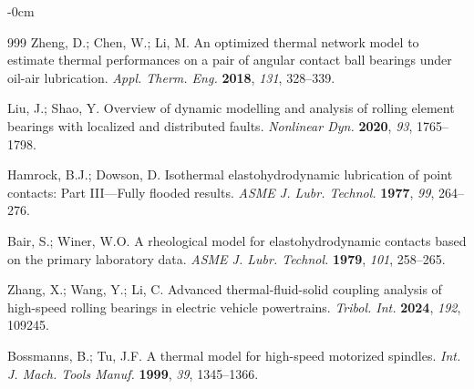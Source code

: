 \documentclass[applsci,article,submit,pdftex,moreauthors]{Definitions/mdpi}
\begin{document}
\begin{adjustwidth}{-\extralength}{0cm}
{\begin{thebibliography}{999}
Zheng, D.; Chen, W.; Li, M. An optimized thermal network model to estimate thermal performances on a pair of angular contact ball bearings under oil-air lubrication. {\em Appl. Therm. Eng.} {\bf 2018}, {\em 131}, 328--339.

Liu, J.; Shao, Y. Overview of dynamic modelling and analysis of rolling element bearings with localized and distributed faults. {\em Nonlinear Dyn.} {\bf 2020}, {\em 93}, 1765--1798.

Hamrock, B.J.; Dowson, D. Isothermal elastohydrodynamic lubrication of point contacts: Part III---Fully flooded results. {\em ASME J. Lubr. Technol.} {\bf 1977}, {\em 99}, 264--276.

Bair, S.; Winer, W.O. A rheological model for elastohydrodynamic contacts based on the primary laboratory data. {\em ASME J. Lubr. Technol.} {\bf 1979}, {\em 101}, 258--265.

Zhang, X.; Wang, Y.; Li, C. Advanced thermal-fluid-solid coupling analysis of high-speed rolling bearings in electric vehicle powertrains. {\em Tribol. Int.} {\bf 2024}, {\em 192}, 109245.

Bossmanns, B.; Tu, J.F. A thermal model for high-speed motorized spindles. {\em Int. J. Mach. Tools Manuf.} {\bf 1999}, {\em 39}, 1345--1366.

\end{thebibliography}
}

\PublishersNote{}
\end{adjustwidth}
\end{document}

